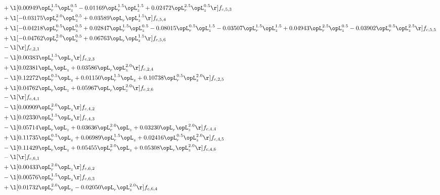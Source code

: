 \begin{alignat}{2}
& + \l[  0.00949 \opL_r^{1.5} \opL_z^{0.5}   -0.01169 \opL_r^{1.5} \opL_z^{1.5} +  0.02472 \opL_r^{2.5} \opL_z^{0.5}  \r] f_{c,5,3} \nonumber \\ 
& + \l[  -0.03175 \opL_r^{2.0} \opL_z^{0.5} +  0.03589 \opL_r \opL_z^{1.5}  \r] f_{c,5,4} \nonumber \\ 
& + \l[  -0.04218 \opL_r^{0.5} \opL_z^{0.5} +  0.02847 \opL_r^{1.5} \opL_z^{0.5}   -0.08015 \opL_r^{0.5} \opL_z^{1.5}   -0.03507 \opL_r^{1.5} \opL_z^{1.5} +  0.04943 \opL_r^{2.5} \opL_z^{0.5}   -0.03902 \opL_r^{0.5} \opL_z^{2.5}  \r] f_{c,5,5} \nonumber \\ 
& + \l[  -0.04762 \opL_r^{2.0} \opL_z^{0.5} +  0.06763 \opL_r \opL_z^{1.5}  \r] f_{c,5,6} \nonumber \\ 
& - \l[  \r] f_{c,2,1} \nonumber \\ 
& - \l[  0.00383 \opL_r^{1.5} \opL_z  \r] f_{c,2,3} \nonumber \\ 
& + \l[  0.02381 \opL_r \opL_z +  0.03586 \opL_r \opL_z^{2.0}  \r] f_{c,2,4} \nonumber \\ 
& - \l[  0.12272 \opL_r^{0.5} \opL_z +  0.01150 \opL_r^{1.5} \opL_z +  0.10738 \opL_r^{0.5} \opL_z^{2.0}  \r] f_{c,2,5} \nonumber \\ 
& + \l[  0.04762 \opL_r \opL_z +  0.05967 \opL_r \opL_z^{2.0}  \r] f_{c,2,6} \nonumber \\ 
& - \l[  \r] f_{c,4,1} \nonumber \\ 
& - \l[  0.00909 \opL_r^{2.0} \opL_z  \r] f_{c,4,2} \nonumber \\ 
& + \l[  0.02330 \opL_r^{1.5} \opL_z  \r] f_{c,4,3} \nonumber \\ 
& - \l[  0.05714 \opL_r \opL_z +  0.03636 \opL_r^{2.0} \opL_z +  0.03230 \opL_r \opL_z^{2.0}  \r] f_{c,4,4} \nonumber \\ 
& + \l[  0.11735 \opL_r^{0.5} \opL_z +  0.06989 \opL_r^{1.5} \opL_z +  0.02416 \opL_r^{0.5} \opL_z^{2.0}  \r] f_{c,4,5} \nonumber \\ 
& - \l[  0.11429 \opL_r \opL_z +  0.05455 \opL_r^{2.0} \opL_z +  0.05308 \opL_r \opL_z^{2.0}  \r] f_{c,4,6} \nonumber \\ 
& - \l[  \r] f_{c,6,1} \nonumber \\ 
& + \l[  0.00433 \opL_r^{2.0} \opL_z  \r] f_{c,6,2} \nonumber \\ 
& - \l[  0.00576 \opL_r^{1.5} \opL_z  \r] f_{c,6,3} \nonumber \\ 
& + \l[  0.01732 \opL_r^{2.0} \opL_z   -0.02050 \opL_r \opL_z^{2.0}  \r] f_{c,6,4} \nonumber \\ 

\end{alignat}
